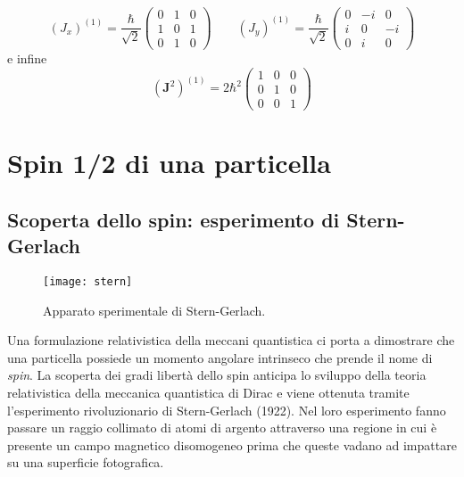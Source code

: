 \begin{enumerate}
\begin{equation*}
	\left(J_x\right)^{(1)}=\frac{\hbar}{\sqrt{2}}\left(\begin{array}{ccc}
0 & 1 & 0 \\
1 & 0 & 1 \\
0 & 1 & 0
\end{array}\right) \quad \quad \left(J_y\right)^{(1)}=\frac{\hbar}{\sqrt{2}}\left(\begin{array}{ccc}
0 & -i & 0 \\
i & 0 & -i \\
0 & i & 0
\end{array}\right)
\end{equation*}
e infine 
\begin{equation*}
	\left(\mathbf{J}^2\right)^{(1)}=2 \hbar^2\left(\begin{array}{lll}
1 & 0 & 0 \\
0 & 1 & 0 \\
0 & 0 & 1
\end{array}\right)
\end{equation*}
\end{enumerate}

\section{Spin 1/2 di una particella}

\subsection{Scoperta dello spin: esperimento di Stern-Gerlach}
\begin{wrapfigure}{r}{0.4\textwidth} %
    \centering
    \texttt{[image: stern]} %
    \caption{Apparato sperimentale di Stern-Gerlach.}
\end{wrapfigure}
Una formulazione relativistica della meccani quantistica ci porta a dimostrare che una particella possiede un momento angolare intrinseco che prende il nome di \textit{spin}. La scoperta dei gradi libert\`a dello spin  anticipa lo sviluppo della teoria relativistica della meccanica quantistica di Dirac e viene ottenuta tramite l'esperimento rivoluzionario di Stern-Gerlach (1922). Nel loro esperimento fanno passare un raggio collimato di atomi di argento attraverso una regione in cui \`e presente un campo magnetico disomogeneo prima che queste vadano ad impattare su una superficie fotografica.

